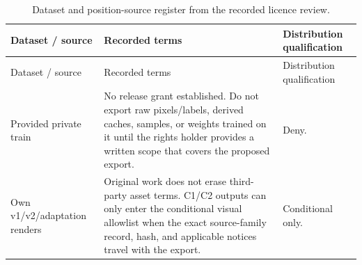 \begin{longtable}{>{\raggedright\arraybackslash}p{.18\linewidth}>{\raggedright\arraybackslash}p{.39\linewidth}>{\raggedright\arraybackslash}p{.35\linewidth}}
\caption{Dataset and position-source register from the recorded licence review.}\label{tab:datasetlicences}\\
\toprule
Dataset / source & %
Recorded terms & %
Distribution qualification \\ %
\midrule

\endfirsthead
\toprule
Dataset / source & %
Recorded terms & %
Distribution qualification \\ %
\midrule

\endhead
\bottomrule\endfoot
Provided private train & %
No release grant established. Do not export raw pixels/labels, derived caches, samples, or weights trained on it until the rights holder provides a written scope that covers the proposed export. & %
Deny. \\ %

Own v1/v2/adaptation renders & %
Original work does not erase third-party asset terms. C1/C2 outputs can only enter the conditional visual allowlist when the exact source-family record, hash, and applicable notices travel with the export. & %
Conditional only. \\ %


\end{longtable}
